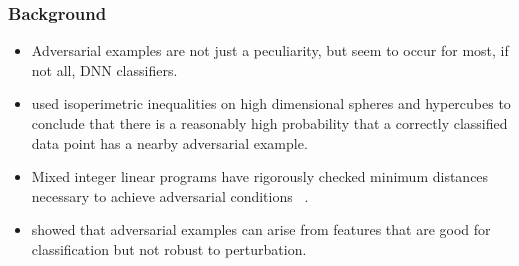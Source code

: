 

\begin{frame}
  \frametitle{Background}

  \begin{itemize}
    \item Adversarial examples are not just a peculiarity, but seem to occur
      for most, if not all, DNN classifiers.
      \item \citet{inevitable2018} used isoperimetric inequalities on high
 dimensional spheres and hypercubes to conclude that there is a
 reasonably high probability that a correctly classified data point
 has a nearby adversarial example.
 \item Mixed integer linear programs have rigorously checked minimum
   distances necessary to achieve adversarial conditions
   ~\citep{tjeng2017evaluating}.
   \item \citet{ilyas2019adversarial} showed that adversarial examples
     can arise from features that are good for classification but not
     robust to perturbation.
     \end{itemize}
\end{frame}
  

